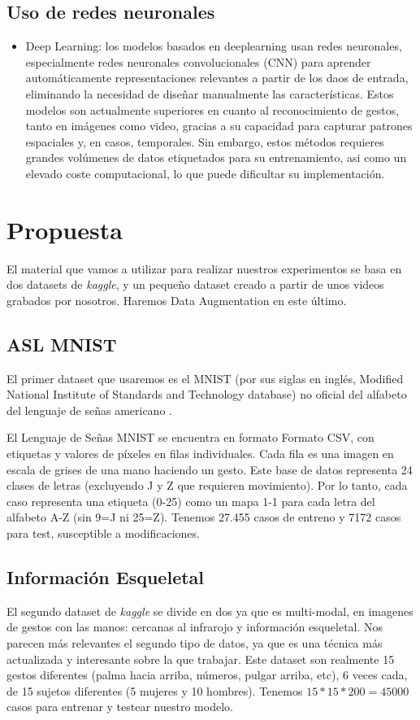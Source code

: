 \documentclass[10pt,a4paper,twocolumn,twoside]{article}
\begin{document}
\subsection{Uso de redes neuronales}
\begin{itemize}
\item	Deep Learning: los modelos basados en deeplearning usan redes neuronales, especialmente redes neuronales convolucionales (CNN) para aprender automáticamente representaciones relevantes a partir de los daos de entrada, eliminando la necesidad de diseñar manualmente las características. Estos modelos son actualmente superiores en cuanto al reconocimiento de gestos, tanto en imágenes como video, gracias a su capacidad para capturar patrones espaciales y, en casos, temporales. Sin embargo, estos métodos requieres grandes volúmenes de datos etiquetados para su entrenamiento, asi como un elevado coste computacional, lo que puede dificultar su implementación. 
\end{itemize}

\section{Propuesta}
El material que vamos a utilizar para realizar nuestros experimentos se basa en dos datasets de \emph{kaggle}, y un pequeño dataset creado a partir de unos videos grabados por nosotros. Haremos Data Augmentation en este último. 

\subsection{ASL MNIST}
El primer dataset que usaremos es el MNIST (por sus siglas en inglés, Modified National Institute of Standards and Technology database) no oficial del alfabeto del lenguaje de señas americano \cite{dataset_MNIST_ASL}. 

El Lenguaje de Señas MNIST se encuentra en formato Formato CSV, con etiquetas y valores de píxeles en filas individuales. Cada fila es una imagen en escala de grises de una mano haciendo un gesto.  
Este base de datos representa 24 clases de letras (excluyendo J y Z que requieren movimiento). Por lo tanto, cada caso representa una etiqueta (0-25) como un mapa 1-1 para cada letra del alfabeto A-Z (sin 9=J ni 25=Z).
Tenemos 27.455 casos de entreno y 7172 casos para test, susceptible a modificaciones. 

\subsection{Información Esqueletal}
El segundo dataset de \emph{kaggle} \cite{dataset_Multi-Modal} se divide en dos ya que es multi-modal, en imagenes de gestos con las manos: cercanas al infrarojo y información esqueletal. Nos parecen más relevantes el segundo tipo de datos, ya que es una técnica más actualizada y interesante sobre la que trabajar. Este dataset son realmente 15 gestos diferentes (palma hacia arriba, números, pulgar arriba, etc), 6 veces cada, de 15 sujetos diferentes (5 mujeres y 10 hombres). 
Tenemos $15*15*200=45000$ casos para entrenar y testear nuestro modelo. 
\end{document}
